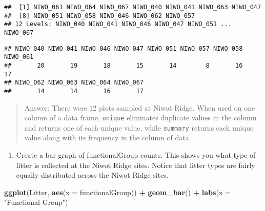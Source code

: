 \documentclass[]{article}
\newenvironment{Shaded}{\begin{snugshade}}{\end{snugshade}}
\newcommand{\CommentTok}[1]{\textcolor[rgb]{0.56,0.35,0.01}{\textit{#1}}}
\newcommand{\DataTypeTok}[1]{\textcolor[rgb]{0.13,0.29,0.53}{#1}}
\newcommand{\KeywordTok}[1]{\textcolor[rgb]{0.13,0.29,0.53}{\textbf{#1}}}
\newcommand{\NormalTok}[1]{#1}
\newcommand{\OperatorTok}[1]{\textcolor[rgb]{0.81,0.36,0.00}{\textbf{#1}}}
\newcommand{\StringTok}[1]{\textcolor[rgb]{0.31,0.60,0.02}{#1}}
\providecommand{\tightlist}{%
  \setlength{\itemsep}{0pt}\setlength{\parskip}{0pt}}
\begin{document}
\begin{Shaded}
\end{Shaded}

\begin{verbatim}
##  [1] NIWO_061 NIWO_064 NIWO_067 NIWO_040 NIWO_041 NIWO_063 NIWO_047
##  [8] NIWO_051 NIWO_058 NIWO_046 NIWO_062 NIWO_057
## 12 Levels: NIWO_040 NIWO_041 NIWO_046 NIWO_047 NIWO_051 ... NIWO_067
\end{verbatim}

\begin{Shaded}
\end{Shaded}

\begin{verbatim}
## NIWO_040 NIWO_041 NIWO_046 NIWO_047 NIWO_051 NIWO_057 NIWO_058 NIWO_061 
##       20       19       18       15       14        8       16       17 
## NIWO_062 NIWO_063 NIWO_064 NIWO_067 
##       14       14       16       17
\end{verbatim}

\begin{quote}
Answer: There were 12 plots sampled at Niwot Ridge. When used on one
column of a data frame, \texttt{unique} eliminates duplicate values in
the column and returns one of each unique value, while \texttt{summary}
returns each unique value along with its frequency in the column of
data.
\end{quote}

\begin{enumerate}
\def\labelenumi{\arabic{enumi}.}
\setcounter{enumi}{13}
\tightlist
\item
  Create a bar graph of functionalGroup counts. This shows you what type
  of litter is collected at the Niwot Ridge sites. Notice that litter
  types are fairly equally distributed across the Niwot Ridge sites.
\end{enumerate}

\begin{Shaded}
\begin{Highlighting}[]
\KeywordTok{ggplot}\NormalTok{(Litter, }\KeywordTok{aes}\NormalTok{(}\DataTypeTok{x =}\NormalTok{ functionalGroup)) }\OperatorTok{+}\StringTok{ }
\StringTok{  }\KeywordTok{geom_bar}\NormalTok{() }\OperatorTok{+}
\StringTok{  }\KeywordTok{labs}\NormalTok{(}\DataTypeTok{x =} \StringTok{"Functional Group"}\NormalTok{)}
\end{Highlighting}
\end{Shaded}
\end{document}
